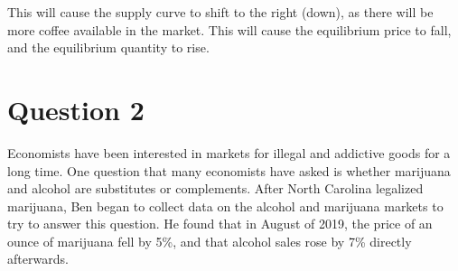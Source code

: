\documentclass{article}
\newcommand{\question}[1]{\pagebreak\section{Question #1}}
\begin{document}
\begin{enumerate}[(a)]
    This will cause the supply curve to shift to the right (down), as there will be more coffee available in the market. This will cause the equilibrium price to fall, and the equilibrium quantity to rise.

\end{enumerate}

\pagebreak

\question{2}

Economists have been interested in markets for illegal and addictive goods for a long time. One question that many economists have asked is whether \textcolor{OliveGreen}{marijuana} and alcohol are substitutes or complements. After North Carolina legalized \textcolor{OliveGreen}{marijuana}, Ben began to collect data on the alcohol and \textcolor{OliveGreen}{marijuana} markets to try to answer this question. He found that in August of 2019, the price of an ounce of \textcolor{OliveGreen}{marijuana} fell by 5\%, and that alcohol sales rose by 7\% directly afterwards.
\end{document}
